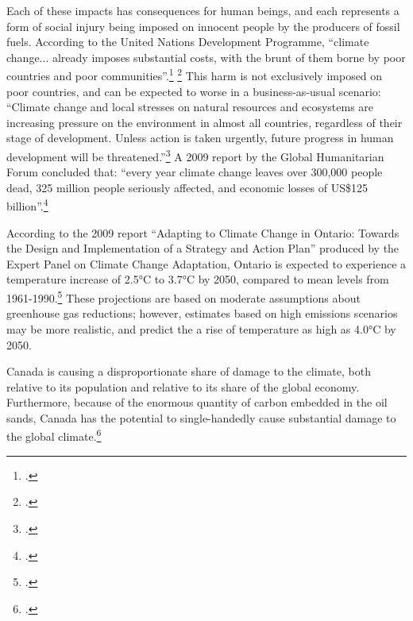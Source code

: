 
Each of these impacts has consequences for human beings, and each represents a form of social injury being imposed on innocent people by the producers of fossil fuels.
According to the United Nations Development Programme, ``climate change... already imposes substantial costs, with the brunt of them borne by poor countries and poor communities''.\footcite[][p. 34]{UNHumanDev2013} \footcite[See also: ][]{WorldBankDevCC}
This harm is not exclusively imposed on poor countries, and can be expected to worse in a business-as-usual scenario: ``Climate change and local stresses on natural resources and ecosystems are increasing pressure on the environment in almost all countries, regardless of their stage of development. Unless action is taken urgently, future progress in human development will be threatened.''\footcite[][p. 87]{UNHumanDev2013}
A 2009 report by the Global Humanitarian Forum concluded that: ``every year climate change leaves over 300,000 people 
dead, 325 million people seriously affected, and economic losses of US\$125 billion''.\footcite[][p. 1]{AnatomySilentCrisis}



According to the 2009 report ``Adapting to Climate Change in Ontario: Towards the Design and Implementation of a Strategy and Action Plan'' produced by the Expert Panel on Climate Change Adaptation, Ontario is expected to experience a temperature increase of 2.5°C to 3.7°C by 2050, compared to mean levels from 1961-1990.\footcite[][p. 15]{ExpertPanelAdapting2009}
These projections are based on moderate assumptions about greenhouse gas reductions; however, estimates based on high emissions scenarios may be more realistic, and predict the a rise of temperature as high as 4.0°C by 2050.



Canada is causing a disproportionate share of damage to the climate, both relative to its population and relative to its share of the global economy.
Furthermore, because of the enormous quantity of carbon embedded in the oil sands, Canada has the potential to single-handedly cause substantial damage to the global climate.\footcite[][]{IrrevocablyTar}



